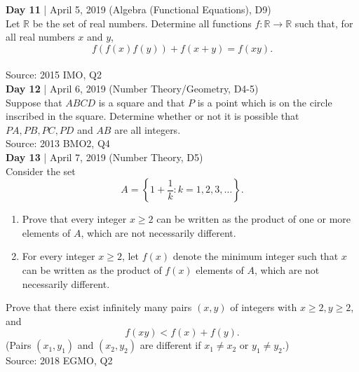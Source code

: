 \documentclass{article}
\newcommand{\problem}[6]{
\textbf{Day #1} | #2 (#5, D#6)\\
#4 \\
Source: #3\\
}
\begin{document}
\problem{11}{April 5, 2019}{2015 IMO, Q2}{Let $\mathbb{R}$ be the set of real numbers. Determine all functions $f : \mathbb{R} \to \mathbb{R}$ such that, for all real numbers $x$ and $y$, \[f(f(x)f(y)) + f(x + y) = f(xy).\]}{Algebra (Functional Equations)}{9}

\problem{12}{April 6, 2019}{2013 BMO2, Q4}{Suppose that $ABCD$ is a square and that $P$ is a point which is on the circle inscribed in the square. Determine whether or not it is possible that $PA, PB, PC, PD$ and $AB$ are all integers.}{Number Theory/Geometry}{4-5}

\problem{13}{April 7, 2019}{2018 EGMO, Q2}{Consider the set
	$$A = \left\{1 + \frac 1k : k = 1, 2, 3, \dots \right\}.$$
	\begin{enumerate}
		\item Prove that every integer $x \geq 2$ can be written as the product of one or more elements of $A$, which
		are not necessarily different.
		\item For every integer $x \geq 2$, let $f(x)$ denote the minimum integer such that $x$ can be written as the
		product of $f(x)$ elements of $A$, which are not necessarily different.
	\end{enumerate}
	\noindent Prove that there exist infinitely many pairs $(x, y)$ of integers with $x \geq 2, y \geq 2$, and
	$$f(xy) < f(x) + f(y).$$
	(Pairs $(x_1, y_1)$ and $(x_2, y_2)$ are different if $x_1 \neq x_2$ or $y_1 \neq y_2$.)}{Number Theory}{5}
\end{document}
